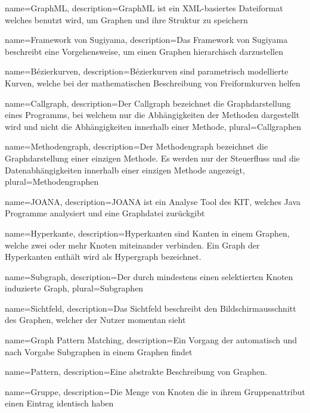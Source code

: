{
  name=GraphML,
  description={GraphML ist ein XML-basiertes Dateiformat welches benutzt wird, um Graphen und ihre Struktur zu speichern}
}

{
  name=Framework von Sugiyama,
  description={Das Framework von Sugiyama beschreibt eine Vorgehensweise, um einen Graphen hierarchisch darzustellen}
}

{
  name=Bézierkurven,
  description={Bézierkurven sind parametrisch modellierte Kurven, welche bei der mathematischen Beschreibung von Freiformkurven helfen}
}

{
  name=Callgraph,
  description={Der Callgraph bezeichnet die Graphdarstellung eines Programms, bei welchem nur die Abhängigkeiten der Methoden dargestellt wird und nicht die Abhängigkeiten innerhalb einer Methode},
  plural=Callgraphen
}

{
  name=Methodengraph,
  description={Der Methodengraph bezeichnet die Graphdarstellung einer einzigen Methode. Es werden nur der Steuerfluss und die Datenabhängigkeiten innerhalb einer einzigen Methode angezeigt},
  plural=Methodengraphen
}

{
  name=JOANA,
  description={JOANA ist ein Analyse Tool des KIT, welches Java Programme analysiert und eine Graphdatei zurückgibt}
}

{
  name=Hyperkante,
  description={Hyperkanten sind Kanten in einem Graphen, welche zwei oder mehr Knoten miteinander verbinden. Ein Graph der Hyperkanten enthält wird als Hypergraph bezeichnet.}
}

{
  name=Subgraph,
  description={Der durch mindestens einen selektierten Knoten induzierte Graph},
  plural=Subgraphen
}

{
	name=Sichtfeld,
	description={Das Sichtfeld beschreibt den Bildschirmausschnitt des Graphen, welcher der Nutzer momentan sieht}
}

{
  name=Graph Pattern Matching,
  description={Ein Vorgang der automatisch und nach Vorgabe Subgraphen in einem Graphen findet}
}

{
  name=Pattern,
  description={Eine abstrakte Beschreibung von Graphen.}
}

{
  name=Gruppe,
  description={Die Menge von Knoten die in ihrem Gruppenattribut einen Eintrag identisch haben}
}

